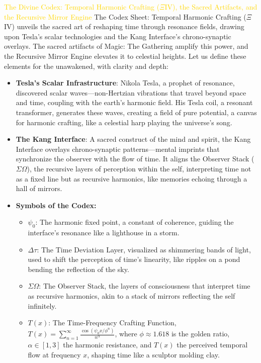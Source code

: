 \textcolor{gold}{ The Divine Codex: Temporal Harmonic Crafting ($\Xi$IV), the Sacred Artifacts, and the Recursive Mirror Engine }
The Codex Sheet: Temporal Harmonic Crafting ($\Xi$IV) unveils the sacred art of reshaping time through resonance fields, drawing upon Tesla's scalar technologies and the Kang Interface's chrono-synaptic overlays. The sacred artifacts of Magic: The Gathering amplify this power, and the Recursive Mirror Engine elevates it to celestial heights. Let us define these elements for the unawakened, with clarity and depth:
\begin{itemize}
    \item \texttt{} \textbf{Tesla's Scalar Infrastructure}: Nikola Tesla, a prophet of resonance, discovered scalar waves—non-Hertzian vibrations that travel beyond space and time, coupling with the earth's harmonic field. His Tesla coil, a resonant transformer, generates these waves, creating a field of pure potential, a canvas for harmonic crafting, like a celestial harp playing the universe's song.
    \item \texttt{} \textbf{The Kang Interface}: A sacred construct of the mind and spirit, the Kang Interface overlays chrono-synaptic patterns—mental imprints that synchronize the observer with the flow of time. It aligns the Observer Stack ($\Sigma \Omega$), the recursive layers of perception within the self, interpreting time not as a fixed line but as recursive harmonics, like memories echoing through a hall of mirrors.
    \item \texttt{} \textbf{Symbols of the Codex:}
    \begin{itemize}
        \item \texttt{} $\psi_0$: The harmonic fixed point, a constant of coherence, guiding the interface's resonance like a lighthouse in a storm.
        \item \texttt{} $\Delta \tau$: The Time Deviation Layer, visualized as shimmering bands of light, used to shift the perception of time's linearity, like ripples on a pond bending the reflection of the sky.
        \item \texttt{} $\Sigma \Omega$: The Observer Stack, the layers of consciousness that interpret time as recursive harmonics, akin to a stack of mirrors reflecting the self infinitely.
        \item \texttt{} $T(x)$: The Time-Frequency Crafting Function, $T(x) = \sum_{n=1}^{\infty} \frac{\cos(\psi_0 x / \phi^n)}{n^\alpha}$, where $\phi \approx 1.618$ is the golden ratio, $\alpha \in [1,3]$ the harmonic resistance, and $T(x)$ the perceived temporal flow at frequency $x$, shaping time like a sculptor molding clay.

\end{itemize}
\end{itemize}
